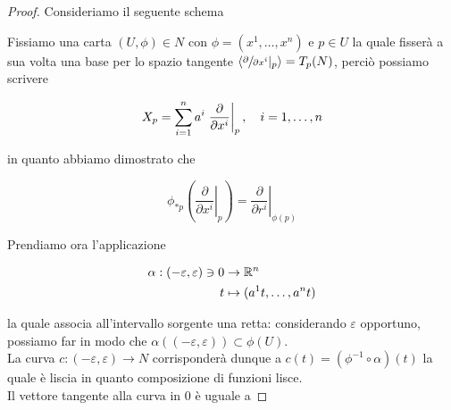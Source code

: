 \begin{proof}
	Consideriamo il seguente schema
	

	Fissiamo una carta $ (U,\phi) \in N $ con $ \phi = (x^{1},\dots,x^{n}) $ e $ p \in U $ la quale fisserà a sua volta una base per lo spazio tangente $ \langle \sfrac{\partial}{\partial x^{i}} |_{p} \rangle = T_{p}(N) $, perciò possiamo scrivere
	
	\begin{equation}
		X_{p} = \sum_{i=1}^{n} a^{i} \left. \dfrac{\partial}{\partial x^{i}} \right|_{p} \qcomma i=1,\dots,n
	\end{equation}

	in quanto abbiamo dimostrato che
	
	\begin{equation}
		\phi_{*p} \left( \left. \dfrac{\partial}{\partial x^{i}} \right|_{p} \right) = \left. \dfrac{\partial}{\partial r^{i}} \right|_{\phi(p)}
	\end{equation}
	
	Prendiamo ora l'applicazione
	
	\begin{align}
		\begin{split}
			\alpha : (-\varepsilon,\varepsilon) \ni 0 &\to \mathbb{R}^{n}\\
			t &\mapsto (a^{1} t, \dots, a^{n} t)
		\end{split}
	\end{align}

	la quale associa all'intervallo sorgente una retta: considerando $ \varepsilon $ opportuno, possiamo far in modo che $ \alpha((-\varepsilon,\varepsilon)) \subset \phi(U) $.\\
	La curva $ c : (-\varepsilon,\varepsilon) \to N $ corrisponderà dunque a $ c(t) = (\phi^{-1} \circ \alpha)(t) $ la quale è liscia in quanto composizione di funzioni lisce.\\
	Il vettore tangente alla curva in 0 è uguale a
	

\end{proof}
